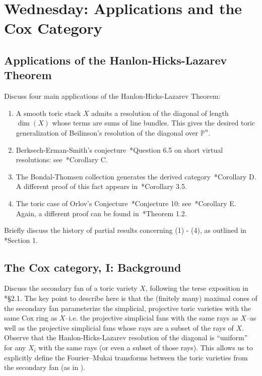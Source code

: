 \documentclass[11pt]{amsart}
\numberwithin{equation}{section}
\theoremstyle{definition}
\theoremstyle{remark}
\newcommand{\PP}{\mathbb P}
\begin{document}
\section{Wednesday: Applications and the Cox Category}
\subsection{Applications of the Hanlon-Hicks-Lazarev Theorem}
Discuss four main applications of the Hanlon-Hicks-Lazarev Theorem:
\begin{enumerate}
\item A smooth toric stack $X$ admits a resolution of the diagonal of length $\dim(X)$ whose terms are sums of line bundles. This gives the desired toric generalization of Beilinson's resolution of the diagonal over $\PP^n$. 
\item Berksech-Erman-Smith's conjecture~\cite{BES20}*{Question 6.5} on short virtual resolutions: see~\cite{HHL24}*{Corollary C}.
\item The Bondal-Thomsen collection generates the derived category~\cite{HHL24}*{Corollary D}.  A different proof of this fact appears in~\cite{FH23}*{Corollary 3.5}.
\item The toric case of Orlov's Conjecture~\cite{Orlov09a}*{Conjecture 10}: see~\cite{HHL24}*{Corollary E}. Again, a different proof can be found in~\cite{FH23}*{Theorem 1.2}.
\end{enumerate}

\noindent Briefly discuss the history of partial results concerning (1) - (4), as outlined in \cite{HHL24}*{Section 1}. 


\subsection{The Cox category, I: Background}
Discuss the secondary fan of a toric variety $X$, following the terse exposition in \cite{BBB+24}*{\S 2.1}. The key point to describe here is that the (finitely many) maximal cones of the secondary fan parameterize the simplicial, projective toric varieties with the same Cox ring as $X$--i.e. the projective simplicial fans with the same rays as $X$--as well as the projective simplicial fans whose rays are a subset of the rays of $X$.
Observe that the Hanlon-Hicks-Lazarev resolution of the diagonal is ``uniform'' for any $X_i$ with the same rays (or even a subset of those rays). This allows us to explicitly define the Fourier--Mukai transforms between the toric varieties from the secondary fan (as in \cite[p. 2]{BBB+24}).
\end{document}
